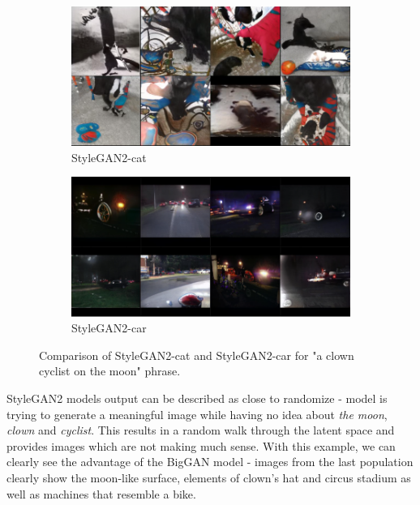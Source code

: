 \documentclass[12pt,a4paper,openany]{book}
\begin{document}
\begin{figure}[H]
\centering
\begin{subfigure}[b]{1.0\textwidth}
   \includegraphics[width=1\linewidth]{clown_stylegancat2.PNG}
   \caption{StyleGAN2-cat}
   \label{fig:Ng1} 
\end{subfigure}

\begin{subfigure}[b]{1.0\textwidth}
   \includegraphics[width=1\linewidth]{clown_stylegancar.PNG}
   \caption{StyleGAN2-car}
   \label{fig:Ng2}
\end{subfigure}

\caption[pics]{Comparison of StyleGAN2-cat and StyleGAN2-car for "a clown cyclist on the moon" phrase.}
\end{figure}


\noindent StyleGAN2 models output can be described as close to randomize - model is trying to generate a meaningful image while having no idea about \textit{the moon}, \textit{clown} and \textit{cyclist}. This results in a random walk through the latent space and provides images which are not making much sense. With this example, we can clearly see the advantage of the BigGAN model - images from the last population clearly show the moon-like surface, elements of clown's hat and circus stadium as well as machines that resemble a bike.
\end{document}
